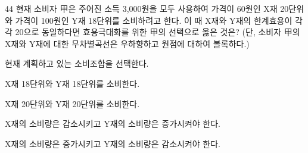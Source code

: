 \begin{question}{44}
현재 소비자 甲은 주어진 소득 3,000원을 모두 사용하여 가격이 60원인 X재 20단위와 가격이 100원인 Y재 18단위를 소비하려고 한다. 이 때 X재와 Y재의 한계효용이 각각 20으로 동일하다면 효용극대화를 위한 甲의 선택으로 옳은 것은? (단, 소비자 甲의 X재와 Y재에 대한 무차별곡선은 우하향하고 원점에 대하여 볼록하다.)
\begin{choices}
  \item 현재 계획하고 있는 소비조합을 선택한다.
  \item X재 18단위와 Y재 18단위를 소비한다.
  \item X재 20단위와 Y재 20단위를 소비한다.
  \item X재의 소비량은 감소시키고 Y재의 소비량은 증가시켜야 한다.
  \item X재의 소비량은 증가시키고 Y재의 소비량은 감소시켜야 한다.
\end{choices}
\end{question}
